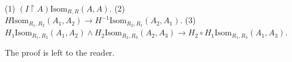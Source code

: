 (1) $(I \upharpoonright A) \text{Isom}_{R, R}(A, A)$.
(2) $H \text{Isom}_{R_1, R_2}(A_1, A_2) \rightarrow H^{-1} \text{Isom}_{R_2, R_1}(A_2, A_1)$.
(3) $H_1 \text{Isom}_{R_1, R_2}(A_1, A_2) \wedge H_2 \text{Isom}_{R_2, R_3}(A_2, A_3) \rightarrow H_2 \circ H_1 \text{Isom}_{R_1, R_3}(A_1, A_3)$.

The proof is left to the reader.
